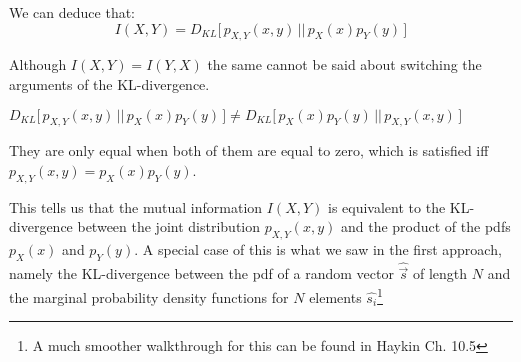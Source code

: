 We can deduce that:
$$
I(X,Y) = D_{KL} \lbrack \, p_{X,Y}(x,y) \, || \, p_X(x) p_Y(y) \, \rbrack
$$

Although $I(X,Y) = I(Y,X)$ the same cannot be said about switching the arguments of the KL-divergence.

$
D_{KL} \lbrack \, p_{X,Y}(x,y) \, || \, p_X(x) p_Y(y) \, \rbrack \ne 
D_{KL} \lbrack \, p_X(x) p_Y(y) \, || \, p_{X,Y}(x,y)\, \rbrack
$

They are only equal when both of them are equal to zero, which is satisfied iff $p_{X,Y}(x,y) = p_X(x) p_Y(y)$.

This tells us that the mutual information $I(X,Y)$ is equivalent to the KL-divergence between the joint distribution $p_{X,Y}(x,y)$ and 
the product of the pdfs $p_X(x)$ and $p_Y(y)$. A special case of this is what we saw in the first approach, namely the KL-divergence 
between the pdf of a random vector $\widehat {\vec s}$ of length $N$ and the marginal probability density functions for $N$ elements 
$\widehat{s_i}$\footnote{A much smoother walkthrough for this can be found in 
Haykin Ch. 10.5}

\clearpage
